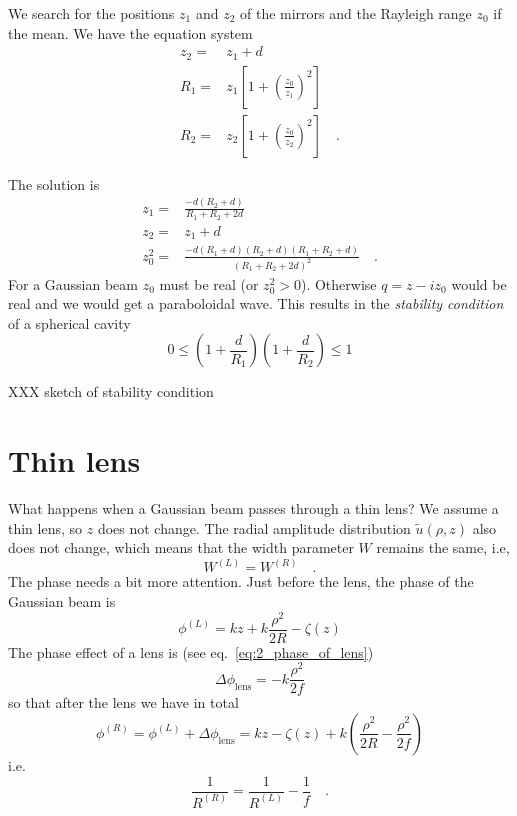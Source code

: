 We search for the positions $z_1$ and $z_2$ of the mirrors and the Rayleigh range $z_0$ if the mean. We have the equation system
\begin{align}
    z_2 = & z_1 + d \\
    R_1 = & z_1 \left[ 1 + \left( \frac{z_0}{z_1} \right)^2 \right] \\
    R_2 = & z_2 \left[ 1 + \left( \frac{z_0}{z_2} \right)^2 \right]  \quad .
\end{align}

The solution is
\begin{align}
    z_1 = & \frac{-d (R_2 + d)}{R_1 + R_2 + 2d} \\
    z_2 = &z_1 + d  \\
    z_0^2 = & \frac{-d (R_1 +d)(R_2 + d)(R_1 + R_2 +d)}{(R_1 + R_2 + 2d)^2} \quad .
\end{align}
For a Gaussian beam $z_0$ must be real (or $z_0^2 > 0$). Otherwise $q = z - i z_0$ would be real and we would get a paraboloidal wave. This results in the \emph{stability condition} of a spherical cavity
\begin{equation}
    0 \le \left( 1 + \frac{d}{R_1} \right) \left( 1 + \frac{d}{R_2} \right) \le 1
\end{equation}

XXX sketch of stability condition

\section{Thin lens}

What happens when a Gaussian beam passes through a thin lens? We assume a thin lens, so $z$ does not change. The radial amplitude distribution $ \tilde{u}(\rho, z)$ also does not change, which means that the width parameter $W$ remains the same, i.e,
\begin{equation}
    W^{(L)} = W^{(R)} \quad .
\end{equation}
The phase needs a bit more attention. Just before the lens, the phase of the Gaussian beam is
\begin{equation}
   \phi^{(L)} =  k z + k  \frac{\rho^2}{2 R}  -  \zeta(z) 
\end{equation}
The phase effect of a lens is (see eq.~\ref{eq:2_phase_of_lens})
\begin{equation}
  \Delta\phi_\text{lens} =   - k \frac{\rho^2}{2f}
\end{equation}
so that after the lens we have in total
\begin{equation}
  \phi^{(R)} =  \phi^{(L)}   + \Delta\phi_\text{lens}  =   k z   -  \zeta(z)  + k  \left( \frac{\rho^2}{2 R} - \frac{\rho^2}{2f} \right)
\end{equation}  
i.e. 
\begin{equation}
    \frac{1}{R^{(R)}} = \frac{1}{R^{(L)}} - \frac{1}{f} \quad .
\end{equation}

